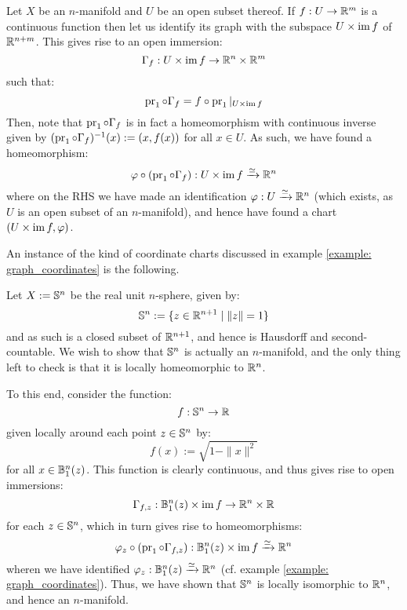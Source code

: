        \begin{example} \label{example: graph_coordinates}
            Let $X$ be an $n$-manifold and $U$ be an open subset thereof. If $f: U \to \mathbb{R}^m$ is a continuous function then let us identify its graph with the subspace $U \x \im f$ of $\mathbb{R}^{n + m}$. This gives rise to an open immersion:
                $$\Gamma_f: U \x \im f \to \R^n \x \R^m$$
            such that:
                $$\pr_1 \circ \Gamma_f = f \circ \pr_1|_{U \x \im f}$$
            Then, note that $\operatorname{pr}_1 \circ \Gamma_f$ is in fact a homeomorphism with continuous inverse given by $( \operatorname{pr}_1 \circ \Gamma_f )^{-1}(x) := ( x, f(x) )$ for all $x \in U$. As such, we have found a homeomorphism:
                $$\varphi \circ (\pr_1 \circ \Gamma_f): U \x \im f \xrightarrow[]{\cong} \R^n$$
            where on the RHS we have made an identification $\varphi: U \xrightarrow[]{\simeq} \mathbb{R}^n$ (which exists, as $U$ is an open subset of an $n$-manifold), and hence have found a chart $(U \x \im f, \varphi)$.
        \end{example}
        \begin{example}[Spheres]
            An instance of the kind of coordinate charts discussed in example \ref{example: graph_coordinates} is the following.

            Let $X := \mathbb{S}^n$ be the real unit $n$-sphere, given by:
                $$\mathbb{S}^n := \{ z \in \mathbb{R}^{n + 1} \mid \|z\| = 1 \}$$
            and as such is a closed subset of $\mathbb{R}^{n + 1}$, and hence is Hausdorff and second-countable. We wish to show that $\mathbb{S}^n$ is actually an $n$-manifold, and the only thing left to check is that it is locally homeomorphic to $\mathbb{R}^n$.
            
            To this end, consider the function:
                $$f: \mathbb{S}^n \to \mathbb{R}$$
            given locally around each point $z \in \mathbb{S}^n$ by:
                $$f(x) := \sqrt{1 - \|x\|^2}$$
            for all $x \in \mathbb{B}^n_1(z)$. This function is clearly continuous, and thus gives rise to open immersions:
                $$\Gamma_{f, z}: \B^n_1(z) \x \im f \to \R^n \x \R$$
            for each $z \in \mathbb{S}^n$, which in turn gives rise to homeomorphisms:
                $$\varphi_z \circ (\pr_1 \circ \Gamma_{f, z}): \B^n_1(z) \x \im f \xrightarrow[]{\cong} \R^n$$
            wheren we have identified $\varphi_z: \mathbb{B}^n_1(z) \xrightarrow[]{\simeq} \mathbb{R}^n$ (cf. example \ref{example: graph_coordinates}). Thus, we have shown that $\mathbb{S}^n$ is locally isomorphic to $\mathbb{R}^n$, and hence an $n$-manifold.
        \end{example}

